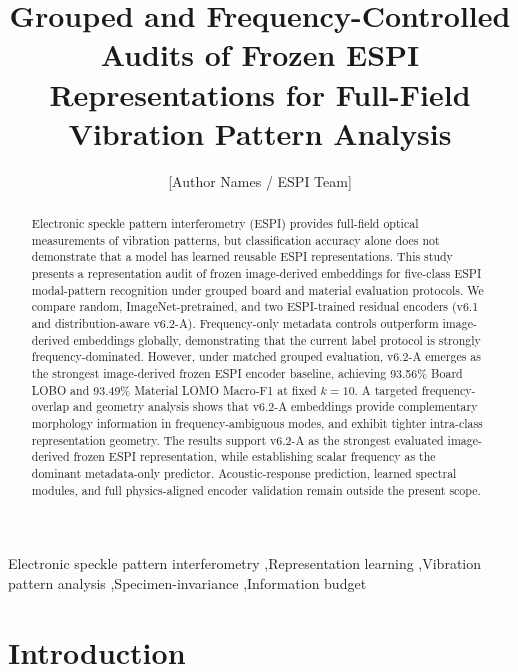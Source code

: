 \documentclass[review,3p,times]{elsarticle}
\begin{document}
\begin{frontmatter}

\title{Grouped and Frequency-Controlled Audits of Frozen ESPI Representations for Full-Field Vibration Pattern Analysis}

\author[inst1]{[Author Names / ESPI Team]}

\begin{abstract}
Electronic speckle pattern interferometry (ESPI) provides full-field optical measurements of vibration patterns, but classification accuracy alone does not demonstrate that a model has learned reusable ESPI representations. This study presents a representation audit of frozen image-derived embeddings for five-class ESPI modal-pattern recognition under grouped board and material evaluation protocols. We compare random, ImageNet-pretrained, and two ESPI-trained residual encoders (v6.1 and distribution-aware v6.2-A). Frequency-only metadata controls outperform image-derived embeddings globally, demonstrating that the current label protocol is strongly frequency-dominated. However, under matched grouped evaluation, v6.2-A emerges as the strongest image-derived frozen ESPI encoder baseline, achieving 93.56\% Board LOBO and 93.49\% Material LOMO Macro-F1 at fixed $k=10$. A targeted frequency-overlap and geometry analysis shows that v6.2-A embeddings provide complementary morphology information in frequency-ambiguous modes, and exhibit tighter intra-class representation geometry. The results support v6.2-A as the strongest evaluated image-derived frozen ESPI representation, while establishing scalar frequency as the dominant metadata-only predictor. Acoustic-response prediction, learned spectral modules, and full physics-aligned encoder validation remain outside the present scope.
\end{abstract}

\begin{keyword}
Electronic speckle pattern interferometry \sep Representation learning \sep Vibration pattern analysis \sep Specimen-invariance \sep Information budget
\end{keyword}

\end{frontmatter}

\section{Introduction}
\label{sec:intro}
\end{document}
